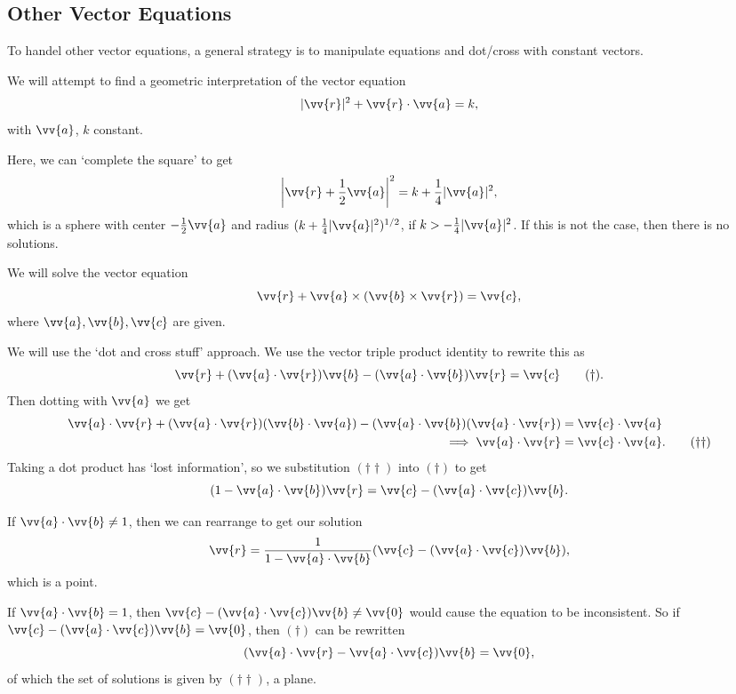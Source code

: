 \subsection{Other Vector Equations}

To handel other vector equations, a general strategy is to manipulate equations and dot/cross with constant vectors.

\begin{example}
    We will attempt to find a geometric interpretation of the vector equation
    $$
    |\vv{r}|^2 + \vv{r} \cdot \vv{a} = k,
    $$
    with $\vv{a}$, $k$ constant.

    Here, we can `complete the square' to get
    $$
    \left|\vv{r} + \frac{1}{2}\vv{a}\right|^2 = k + \frac{1}{4}|\vv{a}|^2,
    $$
    which is a sphere with center $-\frac{1}{2}\vv{a}$ and radius $(k + \frac{1}{4}|\vv{a}|^2)^{1/2}$, if $k > - \frac{1}{4}|\vv{a}|^2$. If this is not the case, then there is no solutions.
\end{example}

\begin{example}
    We will solve the vector equation
    $$
    \vv{r} + \vv{a} \times (\vv{b} \times \vv{r}) = \vv{c},
    $$
    where $\vv{a}, \vv{b}, \vv{c}$ are given.

    We will use the `dot and cross stuff' approach. We use the vector triple product identity to rewrite this as
    \begin{equation}
        \vv{r} + (\vv{a} \cdot \vv{r}) \vv{b} - (\vv{a} \cdot \vv{b})\vv{r} = \vv{c} \tag{$\dagger$}.
    \end{equation}
    Then dotting with $\vv{a}$ we get
    \begin{align*}
        \vv{a} \cdot \vv{r} + (\vv{a} \cdot \vv{r})(\vv{b} \cdot \vv{a}) - (\vv{a} \cdot \vv{b})(\vv{a} \cdot \vv{r}) &= \vv{c} \cdot \vv{a} \nonumber \\
\implies \vv{a} \cdot \vv{r} &= \vv{c} \cdot \vv{a}. \tag{$\dagger \dagger$}
    \end{align*}
    Taking a dot product has `lost information', so we substitution $(\dagger \dagger)$ into $(\dagger)$ to get
    $$
    (1 - \vv{a} \cdot \vv{b}) \vv{r} = \vv{c} - (\vv{a} \cdot \vv{c}) \vv{b}.
    $$

    If $\vv{a} \cdot \vv{b} \neq 1$, then we can rearrange to get our solution
    $$
        \vv{r} = \frac{1}{1 - \vv{a} \cdot \vv{b}} ( \vv{c} - (\vv{a} \cdot \vv{c}) \vv{b}),
    $$
    which is a point.

    If $\vv{a} \cdot \vv{b} = 1$, then $\vv{c} - (\vv{a} \cdot \vv{c})\vv{b} \neq \vv{0}$ would cause the equation to be inconsistent. So if $\vv{c} - (\vv{a} \cdot \vv{c})\vv{b} = \vv{0}$, then $(\dagger)$ can be rewritten
    $$
    (\vv{a} \cdot \vv{r} - \vv{a} \cdot \vv{c}) \vv{b} = \vv{0},
    $$
    of which the set of solutions is given by $(\dagger \dagger)$, a plane.
\end{example}

